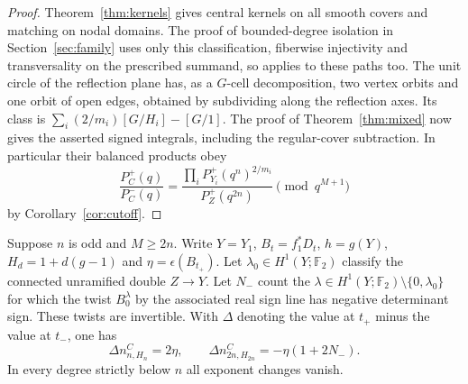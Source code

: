 \begin{proof}
Theorem~\ref{thm:kernels} gives central kernels on all smooth covers
and matching on nodal domains. The proof of bounded-degree isolation
in Section~\ref{sec:family} uses only this classification, fiberwise
injectivity and transversality on the prescribed summand, so applies
to these paths too. The unit circle of the reflection plane has, as a
$G$-cell decomposition, two vertex orbits and one orbit of open edges,
obtained by subdividing along the reflection axes. Its class is
$\sum_i(2/m_i)[G/H_i]-[G/1]$. The proof of Theorem~\ref{thm:mixed}
now gives the asserted signed integrals, including the regular-cover
subtraction. In particular their balanced products obey
\begin{equation}\label{eq:prodwall}
 \frac{P_C^+(q)}{P_C^-(q)}
 =\frac{\prod_i P_{Y_i}^+(q^n)^{2/m_i}}{P_Z^+(q^{2n})}
       \pmod {q^{M+1}}
\end{equation}
by Corollary~\ref{cor:cutoff}.
\end{proof}
\begin{corollary}\label{cor:sign}
Suppose $n$ is odd and $M\ge2n$. Write $Y=Y_1$,
$B_t=f_1^*D_t$, $h=g(Y)$, $H_d=1+d(g-1)$ and
$\eta=\epsilon(B_{t_+})$. Let $\lambda_0\in H^1(Y;\mathbb F_2)$
classify the connected unramified double $Z\to Y$. Let $N_-$ count
the $\lambda\in H^1(Y;\mathbb F_2)\setminus\{0,\lambda_0\}$ for which
the twist $B_0^\lambda$ by the associated real sign line has negative
determinant sign. These twists are invertible. With $\Delta$ denoting
the value at $t_+$ minus the value at $t_-$, one has
\begin{equation}\label{eq:sign}
       \Delta n^C_{n,H_n}=2\eta,\qquad
       \Delta n^C_{2n,H_{2n}}=-\eta(1+2N_-).
\end{equation}
In every degree strictly below $n$ all exponent changes vanish.
\end{corollary}

